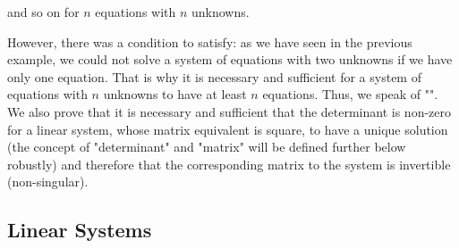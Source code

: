 	and so on for $n$ equations with $n$ unknowns.

	However, there was a condition to satisfy: as we have seen in the previous example, we could not solve a system of equations with two unknowns if we have only one equation. That is why it is necessary and sufficient for a system of equations with $n$ unknowns to have at least $n$ equations. Thus, we speak of "". We also prove that it is necessary and sufficient that the determinant is non-zero for a linear system, whose matrix equivalent is square, to have a unique solution (the concept of "determinant" and "matrix" will be defined further below robustly) and therefore that the corresponding matrix to the system is invertible (non-singular).

\pagebreak
\subsection{Linear Systems}\label{linear systems}

